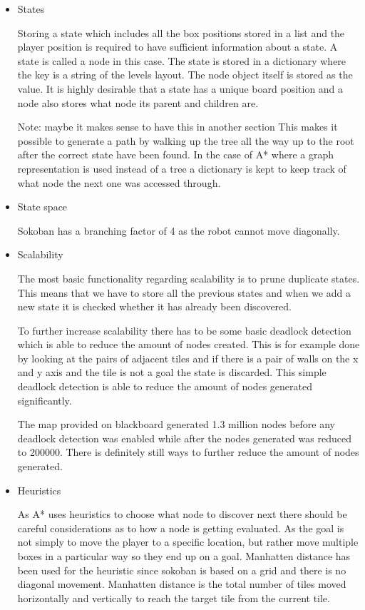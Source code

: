 \documentclass[../../maint.tex]{subfiles}
\begin{document}
\begin{itemize}
	\item States
	
	Storing a state which includes all the box positions stored in a list and the player position is required to have 				sufficient 	information about a state. A state is called a node in this case. The state is stored in a dictionary where 		the key is a string of the levels layout. The node object itself is stored as the value. It is highly desirable that a 			state has a unique board position and a node also stores what node its parent and children are. 

	Note: maybe it makes sense to have this in another section	
	This makes it possible to generate a path by walking up the tree all the way up to the root after the correct state have 		been found.
	In the case of A* where a graph representation is used instead of a tree a dictionary is kept to keep track of what node 		the next one was accessed through.
	
	\item State space
	
	Sokoban has a branching factor of 4 as the robot cannot move diagonally.	
	
	\item Scalability
	
	The most basic functionality regarding scalability is to prune duplicate states. This means that we have to store all the 			previous states and when we add a new state it is checked whether it has already been discovered.
	
	
	To further increase scalability there has to be some basic deadlock detection which is able to reduce the amount of nodes 		created. This is for example done by looking at the pairs of adjacent tiles and if there is a pair of walls on the x and y 	axis and the tile is not a goal the state is discarded. This simple deadlock detection is able to reduce the amount of 			nodes generated significantly. 
	
	The map provided on blackboard generated 1.3 million nodes before any deadlock detection was enabled while after the nodes 	generated was reduced to 200000. There is definitely still ways to further reduce the amount of nodes generated.
	
	\item Heuristics
	
	As A* uses heuristics to choose what node to discover next there should be careful considerations as to how a node is 			getting evaluated. As the goal is not simply to move the player to a specific location, but rather move multiple boxes in 		a particular way so they end up on a goal.
	Manhatten distance has been used for the heuristic since sokoban is based on a grid and there is no diagonal movement. 			Manhatten distance is the total number of tiles moved horizontally and vertically to reach the target tile from the 			current tile. 
	

\end{itemize}
\end{document}
